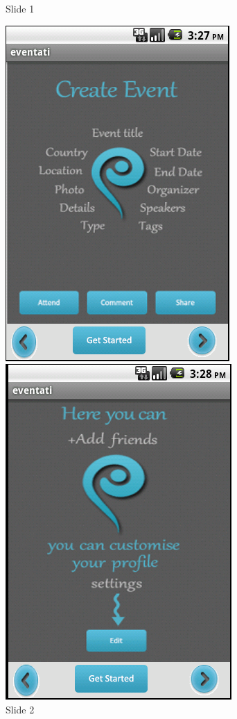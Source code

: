 \documentclass[12pt,a4paper,class,twoside,openany]{report}
\begin{document}
{\begin{figure}
\begin{minipage}[b]{0.5\linewidth}
	\caption{Slide 1}
	\label{fg:6-18}
	\end{minipage}
	\end{figure}
\begin{figure}
	\begin{minipage}[b]{0.5\linewidth}
	\centering
	\includegraphics[height=4 in]{6-19}
	\caption{Slide 2}
     \label{fg:6-19}
	\end{minipage}
	\hspace{0.5cm}
	\begin{minipage}[b]{0.5\linewidth}
	\centering
	\includegraphics[width=\textwidth]{6-20}

\end{minipage}
\end{figure}}
\end{document}
